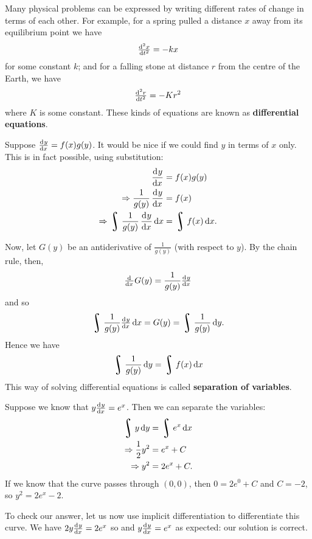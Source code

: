 


Many physical problems can be expressed by writing different rates of change in terms of each other. For example,
for a spring pulled a distance $ x $ away from its equilibrium point we have
\begin{displaymath}
  \od[2]{x}{t} = -kx
\end{displaymath}
for some constant $ k $; and for a falling stone at distance $ r $ from the centre of the Earth, we have
\begin{displaymath}
  \od[2]{r}{t} = -{K}{r^2}
\end{displaymath}
where $ K $ is some constant. These kinds of equations are known as \textbf{differential equations}.

Suppose $ \od{y}{x} = f(x) g(y) $. It would be nice if we could find $ y $ in terms of $ x $ only. This
is in fact possible, using substitution:
\begin{align*}
  \dod{y}{x} &= f(x) g(y) \\
  \Rightarrow \frac{1}{g(y)} \dod{y}{x} &= f(x)\\
  \Rightarrow \rint \frac{1}{g(y)} \dod{y}{x} \dif{x} &= \rint f(x) \dif{x}.
\end{align*}

Now, let $ G(y) $ be an antiderivative of $ \frac{1}{g(y)} $ (with respect to $ y $). By the chain rule, then,
\begin{displaymath}
  \od{}{x} G(y) = \frac{1}{g(y)} \od{y}{x}
\end{displaymath}
and so
\begin{displaymath}
  \rint \frac{1}{g(y)} \od{y}{x} \dif{x} = G(y) = \rint \frac{1}{g(y)} \dif{y}.
\end{displaymath}
Hence we have
\begin{displaymath}
  \rint \frac{1}{g(y)} \dif{y} = \rint f(x) \dif{x}
\end{displaymath}
This way of solving differential equations is called \textbf{separation of variables}.

\begin{ex}
  Suppose we know that $ y\od{y}{x} = e^x $. Then we can separate the variables:
  \begin{align*}
    \rint y \dif{y} &= \rint e^x \dif{x}\\
    \Rightarrow \frac{1}{2} y^2 &= e^x + C\\
    \Rightarrow y^2 &= 2e^x + C.
  \end{align*}
  If we know that the curve passes through $ (0,0) $, then $ 0 = 2e^0 + C $ and $ C = -2 $, so $ y^2 = 2e^x - 2 $.

  To check our answer, let us now use implicit differentiation to differentiate this curve. We have $ 2y \od{y}{x} = 2e^x $ so and $ y \od{y}{x} = e^x $
  as expected: our solution is correct.
\end{ex}

